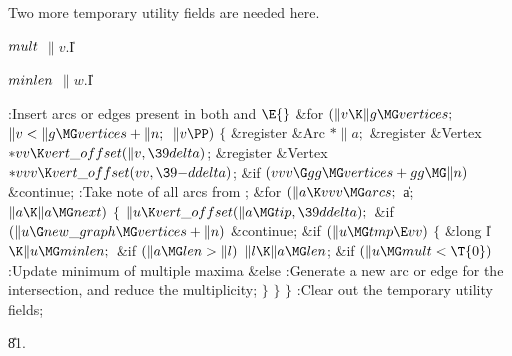 Two more temporary utility fields are needed here.

\Y\B\4\D$\\{mult}$ \5
$\|v.{}$\|I\par
\B\4\D$\\{minlen}$ \5
$\|w.{}$\|I\par
\Y\B\4:Insert arcs or edges present in both  and \X${}%
\E{}$\6
\&{for} ${}(\|v\K\|g\MG\\{vertices};{}$ ${}\|v<\|g\MG\\{vertices}+\|n;{}$ ${}%
\|v\PP){}$\5
${}\{{}$\5
\1\&{register} \&{Arc} ${}{*}\|a;{}$\6
\&{register} \&{Vertex} ${}{*}\\{vv}\K\\{vert\_offset}(\|v,\39\\{delta}){}$;\6
\&{register} \&{Vertex} ${}{*}\\{vvv}\K\\{vert\_offset}(\\{vv},\39{-}%
\\{ddelta}){}$;\7
\&{if} ${}(\\{vvv}\G\\{gg}\MG\\{vertices}+\\{gg}\MG\|n){}$\1\5
\&{continue};\2\6
:Take note of all arcs from \X;\6
\&{for} ${}(\|a\K\\{vvv}\MG\\{arcs};{}$ \|a; ${}\|a\K\|a\MG\\{next}){}$\5
${}\{{}$\1\6
${}\|u\K\\{vert\_offset}(\|a\MG\\{tip},\39\\{ddelta});{}$\6
\&{if} ${}(\|u\G\\{new\_graph}\MG\\{vertices}+\|n){}$\1\5
\&{continue};\2\6
\&{if} ${}(\|u\MG\\{tmp}\E\\{vv}){}$\5
${}\{{}$\5
\1\&{long} \|l${}\K\|u\MG\\{minlen};{}$\7
\&{if} ${}(\|a\MG\\{len}>\|l){}$\1\5
${}\|l\K\|a\MG\\{len}{}$;\2\6
\&{if} ${}(\|u\MG\\{mult}<\T{0}){}$\1\5
:Update minimum of multiple maxima\X\2\6
\&{else}\1\5
:Generate a new arc or edge for the intersection, and reduce the
multiplicity\X;\2\6
\4${}\}{}$\2\6
\4${}\}{}$\2\6
\4${}\}{}$\2\6
:Clear out the temporary utility fields\X;\par
\U81.\fi

